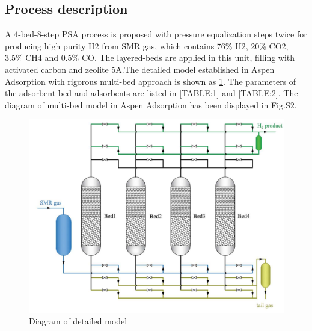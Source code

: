 \documentclass[preprint,12pt]{elsarticle}
\begin{document}
	\subsection{Process description}
	A 4-bed-8-step PSA process is proposed with pressure equalization steps twice for producing high purity H2 from SMR gas, which contains 76\% H2, 20\% CO2, 3.5\% CH4 and 0.5\% CO. The layered-beds are applied in this unit, filling with activated carbon and zeolite 5A.The detailed model established in Aspen Adsorption with rigorous multi-bed approach is shown as \cref{FIG:2}. The parameters of the adsorbent bed and adsorbents are listed in \cref{TABLE:1} and \cref{TABLE:2}. The diagram of multi-bed model in Aspen Adsorption has been displayed in Fig.S2.
	\begin{figure}
		\centering
		\includegraphics[width=1\textwidth]{figs/Fig2.pdf}
		\caption{Diagram of detailed model}
		\label{FIG:2}
	\end{figure}
\end{document}
